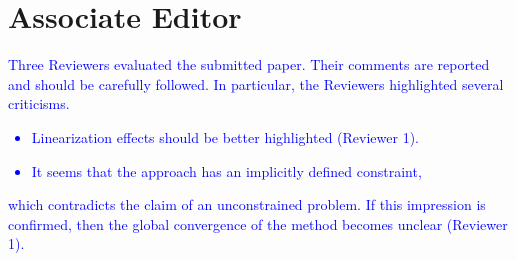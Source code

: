 \section{Associate Editor}
\label{sec:associate_editor}

\textcolor{blue}{Three Reviewers evaluated the submitted paper. Their comments
are reported and should be carefully followed. In particular, the Reviewers
highlighted several criticisms.
\begin{itemize}
    \item Linearization effects should be better highlighted (Reviewer 1).
    \item It seems that the approach has an implicitly defined constraint,
\end{itemize}
which contradicts the claim of an unconstrained problem. If this impression is
confirmed, then the global convergence of the method becomes unclear (Reviewer
1).}


